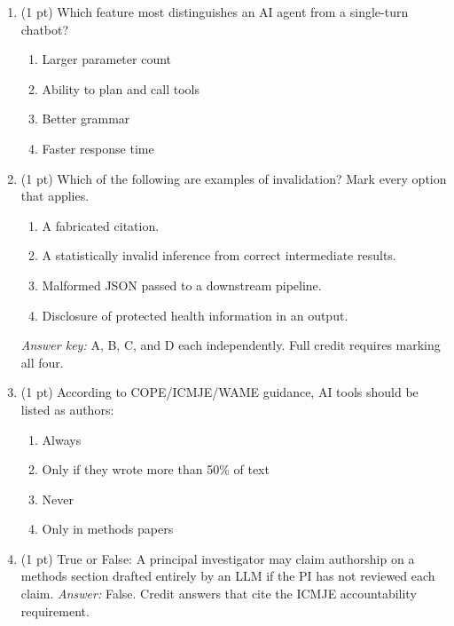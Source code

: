 \documentclass[11pt,letterpaper]{article}
\begin{document}
\begin{enumerate}
    \item (1 pt) Which feature most distinguishes an AI agent from a single-turn chatbot?
    \begin{enumerate}[label=\Alph*.]
        \item Larger parameter count
        \item Ability to plan and call tools
        \item Better grammar
        \item Faster response time
    \end{enumerate}
    
    \item (1 pt) Which of the following are examples of invalidation? Mark every option that applies.
    \begin{enumerate}[label=\Alph*.]
        \item A fabricated citation.
        \item A statistically invalid inference from correct intermediate results.
        \item Malformed JSON passed to a downstream pipeline.
        \item Disclosure of protected health information in an output.
    \end{enumerate}
    \emph{Answer key:} A, B, C, and D each independently. Full credit requires marking all four.
    
    \item (1 pt) According to COPE/ICMJE/WAME guidance, AI tools should be listed as authors:
    \begin{enumerate}[label=\Alph*.]
        \item Always
        \item Only if they wrote more than 50\% of text
        \item Never
        \item Only in methods papers
    \end{enumerate}
    
    \item (1 pt) True or False: A principal investigator may claim authorship on a methods section drafted entirely by an LLM if the PI has not reviewed each claim. \emph{Answer:} False. Credit answers that cite the ICMJE accountability requirement.
    

\end{enumerate}
\end{document}
